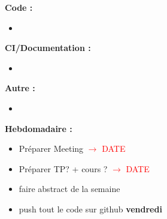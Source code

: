 \textbf{Code :}
\begin{itemize}[label=$\square$] 
	\item 
\end{itemize}
\textbf{CI/Documentation :}
\begin{itemize}[label=$\square$] 
	\item 
\end{itemize}
\textbf{Autre :}
\begin{itemize}[label=$\square$] 
	\item
\end{itemize}
\textbf{Hebdomadaire :}
\begin{itemize}[label=$\square$] 
	\item Préparer Meeting \textcolor{red}{$\rightarrow$ DATE}
	\item Préparer TP? + cours ? \textcolor{red}{$\rightarrow$ DATE}
	\item faire abstract de la semaine 
	\item push tout le code sur github \textbf{vendredi}
\end{itemize}